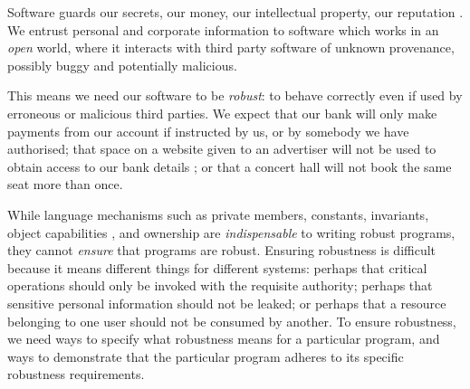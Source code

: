 

Software guards our secrets, our money, our intellectual property,
our reputation \cite{covern}.  We entrust personal and
corporate information to software which works in an \emph{open} world, 
where  it interacts with 
third party software of unknown provenance, possibly buggy and potentially malicious.

This means we need our software to be \emph{robust}:
to behave correctly even if  used 
by erroneous or malicious third parties.
We expect that our bank will only make payments 
from our account if instructed by us, or by somebody we have authorised; 
that space on a website given to an advertiser will not be used
to obtain access to our bank details \cite{cwe}; or that a
concert hall will not book the same seat more than once.





While language mechanisms such as private members,  constants, invariants, 
object capabilities \cite{MillerPhD}, and 
ownership \cite{ownalias} are
\textit{indispensable} to writing robust
programs, they cannot \textit{ensure} that programs are robust.
Ensuring robustness is difficult because it means 
different things for different systems: perhaps
that critical operations should only be invoked with the requisite authority;
perhaps that sensitive personal information should not be leaked; 
or perhaps that a resource belonging to one user should not be consumed by another. 
%
To ensure robustness, we need ways to specify what robustness means for a 
particular program, and ways to demonstrate that the particular program 
adheres to its specific robustness requirements.

